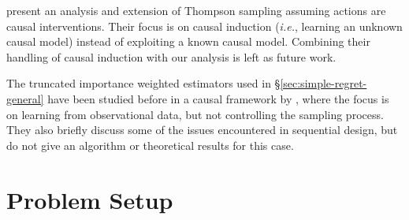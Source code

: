 \documentclass{article}
\newcommand{\ie}{\textit{i.e.}}
\theoremstyle{plain}
\theoremstyle{definition}
\begin{document}

 \citet{Ortega2014thompson} present an analysis and extension of Thompson sampling assuming actions are causal interventions. Their focus is on causal induction (\ie, learning an unknown causal model) instead of exploiting a known causal model. Combining their handling of  causal induction with our analysis is left as future work.

The truncated importance weighted estimators used in \S\ref{sec:simple-regret-general} have been studied before in a causal framework by \citet{BJQ13}, 
where the focus is on learning from observational data, but not controlling the sampling process. They also briefly discuss some of the issues 
encountered in sequential design, but do not give an algorithm or theoretical results for this case.


\section{Problem Setup}
\label{sec:defs}
\newcommand{\bernoulli}{\operatorname{Bernoulli}}
\newcommand{\dirac}{\operatorname{Dirac}}
\renewcommand{\vec}[1]{\boldsymbol{#1}}
\end{document}
